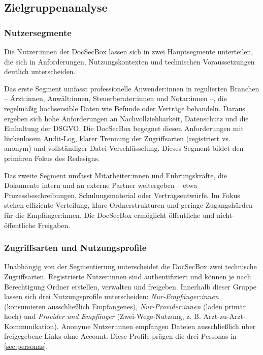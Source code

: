 \subsection{Zielgruppenanalyse}\label{subsec:zielgruppenanalyse}

\subsubsection{Nutzersegmente}\label{sec:nutzersegmente}

Die Nutzer:innen der DocSecBox lassen sich in zwei Hauptsegmente unterteilen, die sich in Anforderungen, Nutzungskontexten und technischen Voraussetzungen deutlich unterscheiden.

Das erste Segment umfasst professionelle Anwender:innen in regulierten Branchen -- Ärzt:innen, Anwält:innen, Steuerberater:innen und Notar:innen --, die regelmäßig hochsensible Daten wie Befunde oder Verträge behandeln. Daraus ergeben sich hohe Anforderungen an Nachvollziehbarkeit, Datenschutz und die Einhaltung der DSGVO. Die DocSecBox begegnet diesen Anforderungen mit lückenlosem Audit-Log, klarer Trennung der Zugriffsarten (registriert vs. anonym) und vollständiger Datei-Verschlüsselung. Dieses Segment bildet den primären Fokus des Redesigns.

Das zweite Segment umfasst Mitarbeiter:innen und Führungskräfte, die Dokumente intern und an externe Partner weitergeben -- etwa Prozessbeschreibungen, Schulungsmaterial oder Vertragsentwürfe. Im Fokus stehen effiziente Verteilung, klare Ordnerstrukturen und geringe Zugangshürden für die Empfänger:innen. Die DocSecBox ermöglicht öffentliche und nicht-öffentliche Freigaben.

\subsubsection{Zugriffsarten und Nutzungsprofile}\label{sec:zugriffsarten}

Unabhängig von der Segmentierung unterscheidet die DocSecBox zwei technische Zugriffsarten. Registrierte Nutzer:innen sind authentifiziert und können je nach Berechtigung Ordner erstellen, verwalten und freigeben. Innerhalb dieser Gruppe lassen sich drei Nutzungsprofile unterscheiden: \textit{Nur-Empfänger:innen} (konsumieren ausschließlich Empfangenes), \textit{Nur-Provider:innen} (laden primär hoch) und \textit{Provider und Empfänger} (Zwei-Wege-Nutzung, z. B. Arzt-zu-Arzt-Kommunikation). Anonyme Nutzer:innen empfangen Dateien ausschließlich über freigegebene Links ohne Account. Diese Profile prägen die drei Personas in \autoref{sec:personas}.
